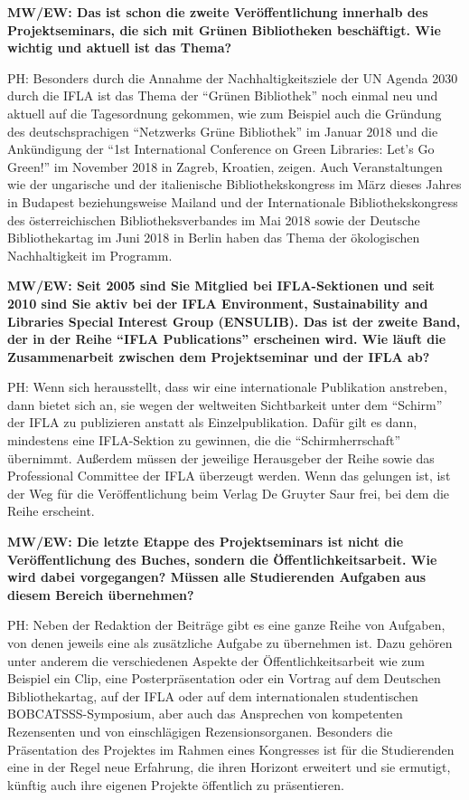 \documentclass[a4paper,
fontsize=11pt,
oneside,
numbers=noperiodatend,
parskip=half-,
bibliography=totoc,
final
]{scrartcl}
\begin{document}
\textbf{MW/EW: Das ist schon die zweite Veröffentlichung innerhalb des
Projektseminars, die sich mit Grünen Bibliotheken beschäftigt. Wie
wichtig und aktuell ist das Thema?}

PH: Besonders durch die Annahme der Nachhaltigkeitsziele der UN Agenda
2030 durch die IFLA ist das Thema der \enquote{Grünen Bibliothek} noch
einmal neu und aktuell auf die Tagesordnung gekommen, wie zum Beispiel
auch die Gründung des deutschsprachigen \enquote{Netzwerks Grüne
Bibliothek} im Januar 2018 und die Ankündigung der \enquote{1st
International Conference on Green Libraries: Let's Go Green!} im
November 2018 in Zagreb, Kroatien, zeigen. Auch Veranstaltungen wie der
ungarische und der italienische Bibliothekskongress im März dieses
Jahres in Budapest beziehungsweise Mailand und der Internationale
Bibliothekskongress des österreichischen Bibliotheksverbandes im Mai
2018 sowie der Deutsche Bibliothekartag im Juni 2018 in Berlin haben das
Thema der ökologischen Nachhaltigkeit im Programm.

\textbf{MW/EW: Seit 2005 sind Sie Mitglied bei IFLA-Sektionen und seit
2010 sind Sie aktiv bei der IFLA Environment, Sustainability and
Libraries Special Interest Group (ENSULIB). Das ist der zweite Band, der
in der Reihe \enquote{IFLA Publications} erscheinen wird. Wie läuft die
Zusammenarbeit zwischen dem Projektseminar und der IFLA ab?}

PH: Wenn sich herausstellt, dass wir eine internationale Publikation
anstreben, dann bietet sich an, sie wegen der weltweiten Sichtbarkeit
unter dem \enquote{Schirm} der IFLA zu publizieren anstatt als
Einzelpublikation. Dafür gilt es dann, mindestens eine IFLA-Sektion zu
gewinnen, die die \enquote{Schirmherrschaft} übernimmt. Außerdem müssen
der jeweilige Herausgeber der Reihe sowie das Professional Committee der
IFLA überzeugt werden. Wenn das gelungen ist, ist der Weg für die
Veröffentlichung beim Verlag De Gruyter Saur frei, bei dem die Reihe
erscheint.

\textbf{MW/EW: Die letzte Etappe des Projektseminars ist nicht die
Veröffentlichung des Buches, sondern die Öffentlichkeitsarbeit. Wie wird
dabei vorgegangen? Müssen alle Studierenden Aufgaben aus diesem Bereich
übernehmen?}

PH: Neben der Redaktion der Beiträge gibt es eine ganze Reihe von
Aufgaben, von denen jeweils eine als zusätzliche Aufgabe zu übernehmen
ist. Dazu gehören unter anderem die verschiedenen Aspekte der
Öffentlichkeitsarbeit wie zum Beispiel ein Clip, eine Posterpräsentation
oder ein Vortrag auf dem Deutschen Bibliothekartag, auf der IFLA oder
auf dem internationalen studentischen BOBCATSSS-Symposium, aber auch das
Ansprechen von kompetenten Rezensenten und von einschlägigen
Rezensionsorganen. Besonders die Präsentation des Projektes im Rahmen
eines Kongresses ist für die Studierenden eine in der Regel neue
Erfahrung, die ihren Horizont erweitert und sie ermutigt, künftig auch
ihre eigenen Projekte öffentlich zu präsentieren.
\end{document}
